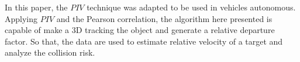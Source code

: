 In this paper, the $PIV$ technique was adapted to be used in vehicles autonomous.
Applying $PIV$ and the Pearson correlation, the algorithm here presented 
is capable of make a 3D tracking the object and generate a relative departure factor. 
So that, the data are used to estimate relative velocity  of a target and analyze the 
collision risk.
